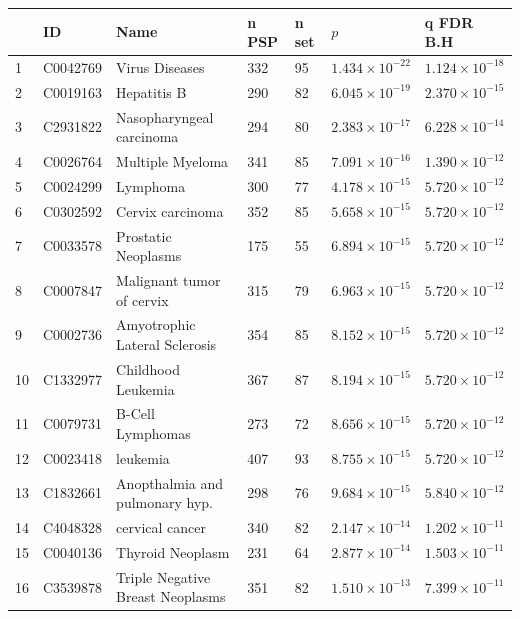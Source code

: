 \begin{table}[ht]
\centering

\setlength{\extrarowheight}{2pt}
\begin{adjustbox}{width=\textwidth}

\begin{tabular}{lllllll}
  \toprule
 & ID & Name & n PSP & n set & $p$ & q FDR B.H \\ 
  \midrule
1 & C0042769 & Virus Diseases & 332 & 95 & $1.434 \times 10^{-22}$ & $1.124 \times 10^{-18}$ \\ 
  2 & C0019163 & Hepatitis B & 290 & 82 & $6.045 \times 10^{-19}$ & $2.370 \times 10^{-15}$ \\ 
  3 & C2931822 & Nasopharyngeal carcinoma & 294 & 80 & $2.383 \times 10^{-17}$ & $6.228 \times 10^{-14}$ \\ 
  4 & C0026764 & Multiple Myeloma & 341 & 85 & $7.091 \times 10^{-16}$ & $1.390 \times 10^{-12}$ \\ 
  5 & C0024299 & Lymphoma & 300 & 77 & $4.178 \times 10^{-15}$ & $5.720 \times 10^{-12}$ \\ 
  6 & C0302592 & Cervix carcinoma & 352 & 85 & $5.658 \times 10^{-15}$ & $5.720 \times 10^{-12}$ \\ 
  7 & C0033578 & Prostatic Neoplasms & 175 & 55 & $6.894 \times 10^{-15}$ & $5.720 \times 10^{-12}$ \\ 
  8 & C0007847 & Malignant tumor of cervix & 315 & 79 & $6.963 \times 10^{-15}$ & $5.720 \times 10^{-12}$ \\ 
  9 & C0002736 & Amyotrophic Lateral Sclerosis & 354 & 85 & $8.152 \times 10^{-15}$ & $5.720 \times 10^{-12}$ \\ 
  10 & C1332977 & Childhood Leukemia & 367 & 87 & $8.194 \times 10^{-15}$ & $5.720 \times 10^{-12}$ \\ 
  11 & C0079731 & B-Cell Lymphomas & 273 & 72 & $8.656 \times 10^{-15}$ & $5.720 \times 10^{-12}$ \\ 
  12 & C0023418 & leukemia & 407 & 93 & $8.755 \times 10^{-15}$ & $5.720 \times 10^{-12}$ \\ 
  13 & C1832661 & Anopthalmia and pulmonary hyp. & 298 & 76 & $9.684 \times 10^{-15}$ & $5.840 \times 10^{-12}$ \\ 
  14 & C4048328 & cervical cancer & 340 & 82 & $2.147 \times 10^{-14}$ & $1.202 \times 10^{-11}$ \\ 
  15 & C0040136 & Thyroid Neoplasm & 231 & 64 & $2.877 \times 10^{-14}$ & $1.503 \times 10^{-11}$ \\ 
  16 & C3539878 & Triple Negative Breast Neoplasms & 351 & 82 & $1.510 \times 10^{-13}$ & $7.399 \times 10^{-11}$ \\ 

\end{tabular}
\end{adjustbox}
\end{table}
